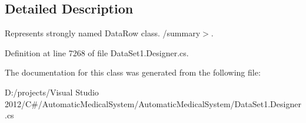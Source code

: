 \subsection{Detailed Description}
Represents strongly named DataRow class. /summary$>$. 

Definition at line 7268 of file DataSet1.Designer.cs.

The documentation for this class was generated from the following file:\begin{CompactItemize}
\item 
D:/projects/Visual Studio 2012/C\#/AutomaticMedicalSystem/AutomaticMedicalSystem/DataSet1.Designer.cs\end{CompactItemize}
